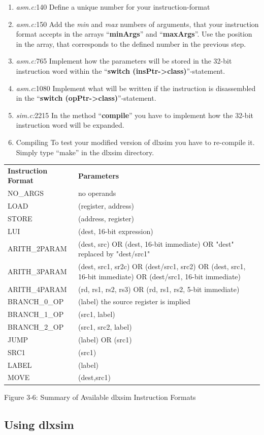 \documentclass[
]{article}
\begin{document}
\begin{enumerate}
\def\labelenumi{\arabic{enumi}.}
\item
  \emph{asm.c:}140 Define a unique number for your instruction-format
\item
  \emph{asm.c:}150 Add the \emph{min} and \emph{max} numbers of
  arguments, that your instruction format accepts in the arrays
  ``\textbf{minArgs}'' and ``\textbf{maxArgs}''. Use the position in the
  array, that corresponds to the defined number in the previous step.
\item
  \emph{asm.c:}765 Implement how the parameters will be stored in the
  32-bit instruction word within the ``\textbf{switch
  (insPtr-\textgreater class)}''-statement.
\item
  \emph{asm.c}:1080 Implement what will be written if the instruction is
  disassembled in the ``\textbf{switch
  (opPtr-\textgreater class)}''-statement.
\item
  \emph{sim.c:}2215 In the method ``\textbf{compile}'' you have to
  implement how the 32-bit instruction word will be expanded.
\item
  Compiling To test your modified version of dlxsim you have to
  re-compile it. Simply type ``make'' in the dlxsim directory.
\end{enumerate}

\begin{longtable}[]{@{}ll@{}}
\toprule
\endhead
\textbf{Instruction Format} & \textbf{Parameters}\tabularnewline
NO\_ARGS & no operands\tabularnewline
LOAD & (register, address)\tabularnewline
STORE & (address, register)\tabularnewline
LUI & (dest, 16-bit expression)\tabularnewline
ARITH\_2PARAM & (dest, src) OR (dest, 16-bit immediate) OR "dest"
replaced by "dest/src1"\tabularnewline
ARITH\_3PARAM & (dest, src1, sr2c) OR (dest/src1, src2) OR (dest, src1,
16-bit immediate) OR (dest/src1, 16-bit immediate)\tabularnewline
ARITH\_4PARAM & (rd, rs1, rs2, rs3) OR (rd, rs1, rs2, 5-bit
immediate)\tabularnewline
BRANCH\_0\_OP & (label) the source register is implied\tabularnewline
BRANCH\_1\_OP & (src1, label)\tabularnewline
BRANCH\_2\_OP & (src1, src2, label)\tabularnewline
JUMP & (label) OR (src1)\tabularnewline
SRC1 & (src1)\tabularnewline
LABEL & (label)\tabularnewline
MOVE & (dest,src1)\tabularnewline
\bottomrule
\end{longtable}

Figure 3‑6: Summary of Available dlxsim Instruction Formats

\hypertarget{using-dlxsim}{%
\subsection{Using dlxsim}\label{using-dlxsim}}
\end{document}
